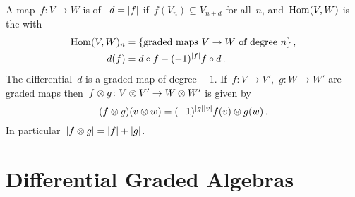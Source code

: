 \documentclass[a4paper,10pt,headings=standardclasses]{scrartcl}
\begin{document}
A map~$f \colon V \to W$ is  of ~$d = \lvert f\rvert$ if~$f(V_n) \subseteq V_{n+d}$ for all~$n$, and~$\operatorname{Hom}(V,W)$ is the {\dgvs} with
\begin{align*}
  \operatorname{Hom}(V,W)_n
  &=
  \{
    \text{graded maps~$V \to W$ of degree~$n$}
  \} \,,
  \\
  d(f)
  &=
  d \circ f - (-1)^{\lvert f\rvert} f \circ d \,.
\end{align*}
The differential~$d$ is a graded map of degree~$-1$.
If~$f \colon V \to V'$,~$g \colon W \to W'$ are graded maps then~$f \otimes g \colon V \otimes V' \to W \otimes W'$ is given by
\[
  (f \otimes g)(v \otimes w)
  =
  (-1)^{\lvert g\rvert \lvert v\rvert}
  f(v) \otimes g(w) \,.
\]
In particular~$\lvert f \otimes g\rvert = \lvert f\rvert + \lvert g\rvert$.







\section{Differential Graded Algebras}
\end{document}

